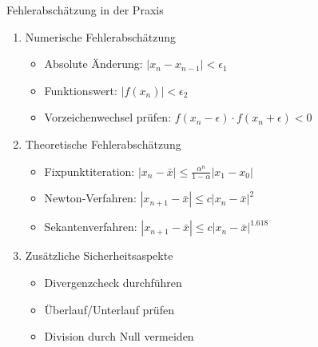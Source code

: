 \begin{KR}{Fehlerabschätzung in der Praxis}
\begin{enumerate}
    \item Numerische Fehlerabschätzung
    \begin{itemize}
        \item Absolute Änderung: $|x_n - x_{n-1}| < \epsilon_1$
        \item Funktionswert: $|f(x_n)| < \epsilon_2$
        \item Vorzeichenwechsel prüfen: $f(x_n-\epsilon) \cdot f(x_n+\epsilon) < 0$
    \end{itemize}
    
    \item Theoretische Fehlerabschätzung
    \begin{itemize}
        \item Fixpunktiteration: $|x_n-\bar{x}| \leq \frac{\alpha^n}{1-\alpha}|x_1-x_0|$
        \item Newton-Verfahren: $|x_{n+1}-\bar{x}| \leq c|x_n-\bar{x}|^2$
        \item Sekantenverfahren: $|x_{n+1}-\bar{x}| \leq c|x_n-\bar{x}|^{1.618}$
    \end{itemize}
    
    \item Zusätzliche Sicherheitsaspekte
    \begin{itemize}
        \item Divergenzcheck durchführen
        \item Überlauf/Unterlauf prüfen
        \item Division durch Null vermeiden
    \end{itemize}
\end{enumerate}
\end{KR}
